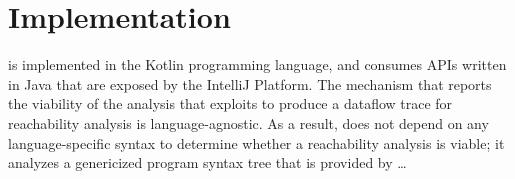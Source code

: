 \section{Implementation}
\label{sec:Impl}

\toolname{} is implemented in the Kotlin programming language, and consumes
\acp{API} written in Java that are exposed by the IntelliJ Platform.
The mechanism that reports the viability of the analysis that \toolname{}
exploits to produce a dataflow trace for reachability analysis is 
language-agnostic.
As a result, \toolname{} does not depend on any language-specific syntax to 
determine whether a reachability analysis is viable; it analyzes a genericized 
program syntax tree that is provided by  \dots

\endinput
